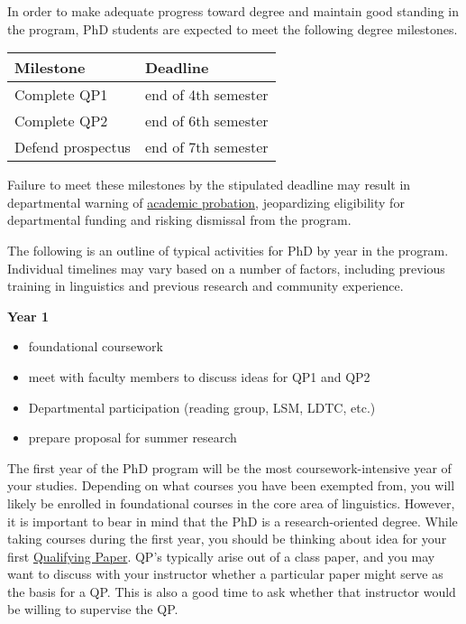 \documentclass[
]{book}
\providecommand{\tightlist}{%
  \setlength{\itemsep}{0pt}\setlength{\parskip}{0pt}}
\begin{document}
In order to make adequate progress toward degree and maintain good standing in the program, PhD students are expected to meet the following degree milestones.

\begin{longtable}[]{@{}ll@{}}
\toprule\noalign{}
Milestone & Deadline \\
\midrule\noalign{}
\endhead
\bottomrule\noalign{}
\endlastfoot
Complete QP1 & end of 4th semester \\
Complete QP2 & end of 6th semester \\
Defend prospectus & end of 7th semester \\
\end{longtable}

Failure to meet these milestones by the stipulated deadline may result in departmental warning of \hyperref[probation]{academic probation}, jeopardizing eligibility for departmental funding and risking dismissal from the program.

The following is an outline of typical activities for PhD by year in the program. Individual timelines may vary based on a number of factors, including previous training in linguistics and previous research and community experience.

\textbf{Year 1}

\begin{itemize}
\tightlist
\item
  foundational coursework
\item
  meet with faculty members to discuss ideas for QP1 and QP2
\item
  Departmental participation (reading group, LSM, LDTC, etc.)
\item
  prepare proposal for summer research
\end{itemize}

The first year of the PhD program will be the most coursework-intensive year of your studies. Depending on what courses you have been exempted from, you will likely be enrolled in foundational courses in the core area of linguistics. However, it is important to bear in mind that the PhD is a research-oriented degree. While taking courses during the first year, you should be thinking about idea for your first \hyperref[qp]{Qualifying Paper}. QP's typically arise out of a class paper, and you may want to discuss with your instructor whether a particular paper might serve as the basis for a QP. This is also a good time to ask whether that instructor would be willing to supervise the QP.
\end{document}
